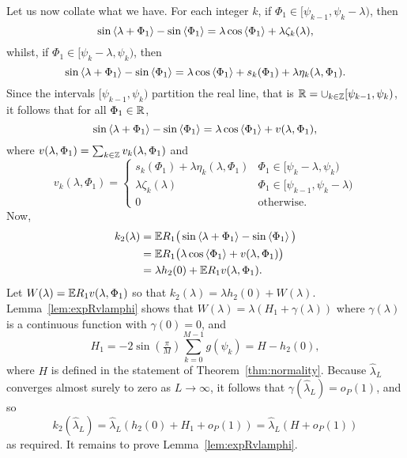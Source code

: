 \documentclass[journal]{IEEEtran}
\begin{document}
\begin{IEEEproof}
Let us now collate what we have.  For each integer $k$, if $\Phi_1 \in [\psi_{k-1}, \psi_{k} - \lambda )$, then
\[
\sin\left\langle \lambda + \Phi_1 \right\rangle - \sin\left\langle \Phi_1 \right\rangle = \lambda\cos\left\langle \Phi_1 \right\rangle + \lambda\zeta_k(\lambda),
\]
whilst, if $\Phi_1 \in [ \psi_{k} - \lambda,\psi_{k})$, then
\[
\sin\left\langle \lambda + \Phi_1 \right\rangle - \sin\left\langle \Phi_1 \right\rangle = \lambda \cos\left\langle \Phi_1 \right\rangle + s_k(\Phi_1) + \lambda\eta_k(\lambda, \Phi_1).
\]
Since the intervals $[\psi_{k-1}, \psi_{k})$ partition the real line, that is ${\mathbb R} = \cup_{k\in{\mathbb Z}}[\psi_{k-1}, \psi_{k})$, it follows that for all $\Phi_1 \in {\mathbb R}$,
\[
\sin\left\langle \lambda + \Phi_1 \right\rangle - \sin\left\langle \Phi_1 \right\rangle = \lambda\cos\left\langle \Phi_1 \right\rangle +  v(\lambda, \Phi_1),
\]
where $v(\lambda, \Phi_1) = \sum_{k\in{\mathbb Z}} v_k(\lambda, \Phi_1)$ and
\begin{equation}\label{eq:vk}
v_k(\lambda,\Phi_1) = \begin{cases}
s_k(\Phi_1) + \lambda\eta_k(\lambda, \Phi_1) &  \Phi_1 \in [ \psi_{k} - \lambda,\psi_{k} ) \\
\lambda\zeta_k(\lambda) & \Phi_1 \in [\psi_{k-1}, \psi_{k} - \lambda ) \\
0 & \text{otherwise}.
\end{cases} 
\end{equation}
Now,
\begin{align*}
k_2(\lambda) &=  {\mathbb E} R_1\big( \sin\left\langle \lambda + \Phi_1 \right\rangle - \sin\left\langle \Phi_1 \right\rangle \big) \\
&= {\mathbb E} R_1\big( \lambda\cos\left\langle \Phi_1 \right\rangle + v(\lambda, \Phi_1)  \big) \\
&= \lambda h_2(0) + {\mathbb E} R_1 v(\lambda, \Phi_1).
\end{align*}
Let $W(\lambda) = {\mathbb E} R_1 v(\lambda, \Phi_1)$ so that $k_2(\lambda) = \lambda h_2(0) + W(\lambda).$  Lemma~\ref{lem:expRvlamphi} shows that $W(\lambda) =  \lambda(H_1 + \gamma(\lambda))$ where $\gamma(\lambda)$ is a continuous function with $\gamma(0) = 0$, and
\[
H_1 = - 2 \sin(\tfrac{\pi}{M}) \sum_{k = 0}^{M-1} g(\psi_k) = H - h_2(0),
\]
where $H$ is defined in the statement of Theorem~\ref{thm:normality}.  Because $\hat{\lambda}_L$ converges almost surely to zero as $L \rightarrow\infty$, it follows that $\gamma(\hat{\lambda}_L) = o_P(1)$, and so
\[
k_2(\hat{\lambda}_L) = \hat{\lambda}_L ( h_2(0) + H_1 + o_P(1) ) = \hat{\lambda}_L ( H + o_P(1) )
\]
as required.  It remains to prove Lemma~\ref{lem:expRvlamphi}.
\end{IEEEproof}
\end{document}
